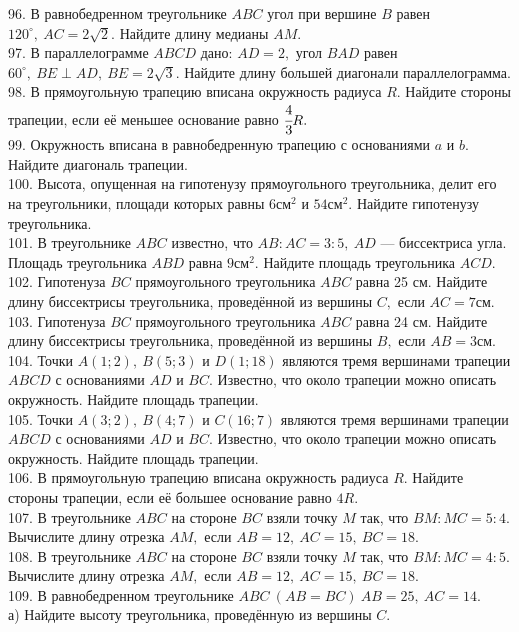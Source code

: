 96. В равнобедренном треугольнике $ABC$ угол при вершине $B$ равен $120^\circ,\ AC=2\sqrt{2}.$ Найдите длину медианы $AM.$\\
97. В параллелограмме $ABCD$ дано: $AD=2,$ угол $BAD$ равен $60^\circ,\ BE\perp AD,\ BE=2\sqrt{3}.$ Найдите длину большей диагонали параллелограмма.\\
98. В прямоугольную трапецию вписана окружность радиуса $R.$ Найдите стороны трапеции, если её меньшее основание равно $\cfrac{4}{3}R.$\\
99. Окружность вписана в равнобедренную трапецию с основаниями  $a$ и $b.$ Найдите диагональ трапеции.\\
100. Высота, опущенная на гипотенузу прямоугольного треугольника, делит его на треугольники, площади которых равны $6\text{см}^2$ и $54\text{см}^2.$ Найдите гипотенузу треугольника.\\
101. В треугольнике $ABC$ известно, что $AB:AC=3:5,\ AD$ --- биссектриса угла. Площадь треугольника $ABD$ равна $9\text{см}^2.$ Найдите площадь треугольника $ACD.$\\
102. Гипотенуза $BC$ прямоугольного треугольника $ABC$ равна 25 см. Найдите длину биссектрисы треугольника, проведённой из вершины $C,$ если $AC=7$см.\\
103. Гипотенуза $BC$ прямоугольного треугольника $ABC$ равна 24 см. Найдите длину биссектрисы треугольника, проведённой из вершины $B,$ если $AB=3$см.\\
104. Точки $A(1;2),\ B(5;3)$ и $D(1;18)$ являются тремя вершинами трапеции
$ABCD$ с основаниями $AD$ и $BC.$ Известно, что около трапеции можно описать окружность. Найдите площадь трапеции.\\
105. Точки $A(3;2),\ B(4;7)$ и $C(16;7)$ являются тремя вершинами трапеции
$ABCD$ с основаниями $AD$ и $BC.$ Известно, что около трапеции можно описать окружность. Найдите площадь трапеции.\\
106. В прямоугольную трапецию вписана окружность радиуса $R.$ Найдите стороны трапеции, если её большее основание равно $4R.$\\
107. В треугольнике $ABC$ на стороне $BC$ взяли точку $M$ так, что $BM:MC=5:4.$ Вычислите длину отрезка $AM,$ если $AB=12,\ AC=15,\ BC=18.$\\
108. В треугольнике $ABC$ на стороне $BC$ взяли точку $M$ так, что $BM:MC=4:5.$ Вычислите длину отрезка $AM,$ если $AB=12,\ AC=15,\ BC=18.$\\
109. В равнобедренном треугольнике $ABC\ (AB=BC)\ AB=25,\ AC=14.$\\
а) Найдите высоту треугольника, проведённую из вершины $C.$\\
